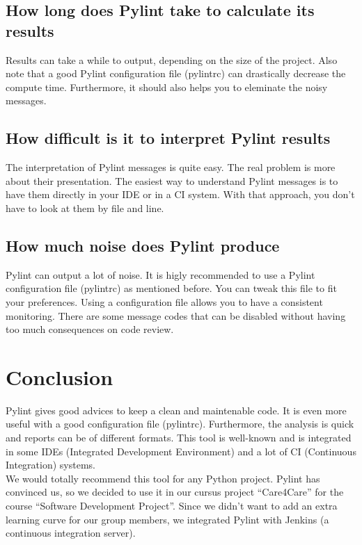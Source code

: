 \documentclass[12pt, a4paper]{article}
\newcommand{\pyl}{\textsf{Pylint}}
\begin{document}
\subsection*{How long does \pyl{} take to calculate its results}

Results can take a while to output, depending on the size of the project.
Also note that a good \pyl{} configuration file (pylintrc) can drastically decrease the compute time.
Furthermore, it should also helps you to eleminate the noisy messages.

\subsection*{How difficult is it to interpret \pyl{} results}

The interpretation of \pyl{} messages is quite easy.
The real problem is more about their presentation.
The easiest way to understand \pyl{} messages is to have them directly in your IDE or in a CI system.
With that approach, you don't have to look at them by file and line.

\subsection*{How much noise does \pyl{} produce}

\pyl{} can output a lot of noise.
It is higly recommended to use a \pyl{} configuration file (pylintrc) as mentioned before.
You can tweak this file to fit your preferences.
Using a configuration file allows you to have a consistent monitoring.
There are some message codes that can be disabled without having too much consequences on code review.

\section*{Conclusion}

\pyl{} gives good advices to keep a clean and maintenable code.
It is even more useful with a good configuration file (pylintrc).
Furthermore, the analysis is quick and reports can be of different formats.
This tool is well-known and is integrated in some IDEs (Integrated Development Environment) and a lot of CI (Continuous Integration) systems.\\


We would totally recommend this tool for any Python project.
\pyl{} has convinced us, so we decided to use it in our cursus project ``Care4Care'' for the course ``Software Development Project''.
Since we didn't want to add an extra learning curve for our group members, we integrated \pyl{} with Jenkins (a continuous integration server).
\end{document}
